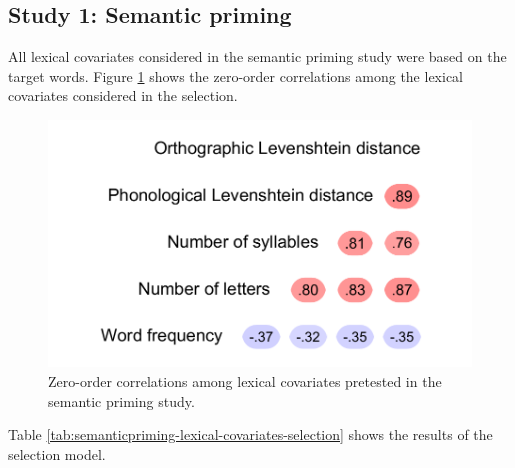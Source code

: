 \documentclass[
  12pt,
  man,floatsintext]{apa7}
\begin{document}
\hypertarget{study-1-semantic-priming-1}{%
\subsection{Study 1: Semantic priming}\label{study-1-semantic-priming-1}}

All lexical covariates considered in the semantic priming study were based on the target words. Figure \ref{fig:semanticpriming-lexical-covariates-correlations} shows the zero-order correlations among the lexical covariates considered in the selection.

\begin{figure}

{\centering \includegraphics[width=0.5\linewidth]{manuscript_files/figure-latex/semanticpriming-lexical-covariates-correlations-1} 

}

\caption{Zero-order correlations among lexical covariates pretested in the semantic priming study.}\label{fig:semanticpriming-lexical-covariates-correlations}
\end{figure}

Table \ref{tab:semanticpriming-lexical-covariates-selection} shows the results of the selection model.
\end{document}
